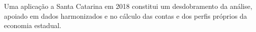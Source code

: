 \documentclass[11pt]{article}
\begin{document}
Uma aplicação a Santa Catarina em 2018 constitui um desdobramento da análise, apoiado em dados harmonizados e no cálculo das contas e dos perfis próprios da economia estadual.

\clearpage
\begingroup
{}
\raggedright
\printbibliography[title={Referências}]
\endgroup

\end{document}
